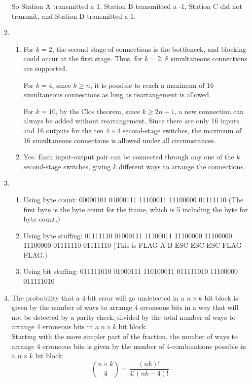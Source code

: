 \documentclass{article}
\begin{document}
\begin{enumerate}
So Station A transmitted a 1, Station B transmitted a -1, Station C did not transmit, and Station D transmitted a 1.

\item
\begin{enumerate}

\item For $k=2$, the second stage of connections is the bottleneck, and blocking could occur at the first stage. Thus, for $k=2$, 8 simultaneous connections are supported.

For $k=4$, since $k \geq n$, it is possible to reach a maximum of 16 simultaneous connections as long as rearrangement is allowed.

For $k=10$, by the Clos theorem, since $k \geq 2n-1$, a new connection can always be added without rearrangement. Since there are only 16 inputs and 16 outputs for the ten $4 \times 4$ second-stage switches, the maximum of 16 simultaneous connections is allowed under all circumstances.

\item Yes. Each input-output pair can be connected through any one of the $k$ second-stage switches, giving $k$ different ways to arrange the connections.

\end{enumerate}

\item
\begin{enumerate}

\item Using byte count:  00000101 01000111 11100011 11100000 01111110 (The first byte is the byte count for the frame, which is 5 including the byte for byte count.)

\item Using byte stuffing: 01111110 01000111 11100011 11100000 11100000 11100000 01111110 01111110
(This is FLAG A B ESC ESC ESC FLAG FLAG.) 

\item Using bit stuffing: 011111010 01000111 110100011 011111010 11100000 011111010

\end{enumerate}

\item The probability that a 4-bit error will go undetected in a $n \times k$ bit block is given by the number of ways to arrange 4 erroneous bits in a way that will not be detected by a parity check, divided by the total number of ways to arrange 4 erroneous bits in a $n \times k$ bit block. \\
Starting with the more simpler part of the fraction, the number of ways to arrange 4 erroneous bits is given by the number of 4-combinations possible in a $n \times k$ bit block:
$$\binom {n \times k} {4} = \frac{(nk)!}{4!(nk-4)!} $$


\end{enumerate}
\end{document}
